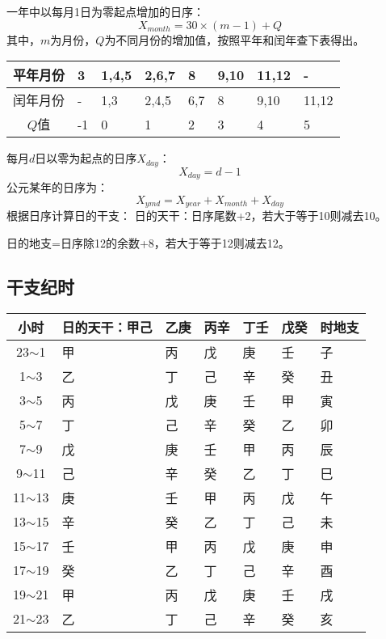 一年中以每月1日为零起点增加的日序：
\begin{equation}
	X_{month}=30\times(m-1)+Q
\end{equation}
其中，$m$为月份，$Q$为不同月份的增加值，按照平年和闰年查下表得出。
\begin{center}
	\begin{tabularx}{\textwidth}{|c|X|X|X|X|X|X|X|}
		\hline
		平年月份&3&1,4,5&2,6,7&8&9,10&11,12&-\\
		\hline
		闰年月份&-&1,3&2,4,5&6,7&8&9,10&11,12\\
		\hline
		$Q$值&-1&0&1&2&3&4&5\\	
		\hline
	\end{tabularx}
\end{center}
每月$d$日以零为起点的日序$X_{day}$：
\begin{equation}
	X_{day}=d-1
\end{equation}
公元某年的日序为：
\begin{equation}
	X_{ymd}=X_{year}+X_{month}+X_{day}
\end{equation}
根据日序计算日的干支：
日的天干：日序尾数+2，若大于等于10则减去10。

日的地支=日序除12的余数+8，若大于等于12则减去12。
\subsection{干支纪时}
\begin{center}
	\begin{tabularx}{\textwidth}{|c|X|X|X|X|X|X|}
		\hline
		小时&日的天干：甲己&乙庚&丙辛&丁壬&戊癸&时地支\\
		\hline
		23$\sim$1&甲&丙&戊&庚&壬&子\\
		\hline
		1$\sim$3&乙&丁&己&辛&癸&丑\\
		\hline
		3$\sim$5&丙&戊&庚&壬&甲&寅\\
		\hline
		5$\sim$7&丁&己&辛&癸&乙&卯\\
		\hline
		7$\sim$9&戊&庚&壬&甲&丙&辰\\
		\hline
		9$\sim$11&己&辛&癸&乙&丁&巳\\
		\hline
		11$\sim$13&庚&壬&甲&丙&戊&午\\
		\hline
		13$\sim$15&辛&癸&乙&丁&己&未\\
		\hline
		15$\sim$17&壬&甲&丙&戊&庚&申\\
		\hline
		17$\sim$19&癸&乙&丁&己&辛&酉\\
		\hline
		19$\sim$21&甲&丙&戊&庚&壬&戌\\
		\hline
		21$\sim$23&乙&丁&己&辛&癸&亥\\
		\hline
	\end{tabularx}
\end{center}
